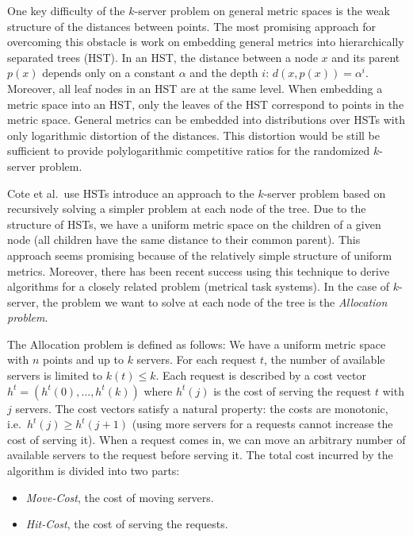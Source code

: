 One key difficulty of the $k$-server problem on general metric spaces is the weak structure of the distances between points.
The most promising approach for overcoming this obstacle is work on embedding general metrics into hierarchically separated trees (HST).
In an HST, the distance between a node $x$ and its parent $p(x)$ depends only on a constant $\alpha$ and the depth $i$: $d(x, p(x)) = \alpha^i$.
Moreover, all leaf nodes in an HST are at the same level.
When embedding a metric space into an HST, only the leaves of the HST correspond to points in the metric space.
General metrics can be embedded into distributions over HSTs with only logarithmic distortion of the distances.
This distortion would be still be sufficient to provide polylogarithmic competitive ratios for the randomized $k$-server problem.

Cote et al.\ use HSTs introduce an approach to the $k$-server problem based on recursively solving a simpler problem at each node of the tree.
Due to the structure of HSTs, we have a uniform metric space on the children of a given node (all children have the same distance to their common parent).
This approach seems promising because of the relatively simple structure of uniform metrics.
Moreover, there has been recent success using this technique to derive algorithms for a closely related problem (metrical task systems).
In the case of $k$-server, the problem we want to solve at each node of the tree is the \emph{Allocation problem}.

The Allocation problem is defined as follows:
We have a uniform metric space with $n$ points and up to $k$ servers.
For each request $t$, the number of available servers is limited to $k(t) \leq k$.
Each request is described by a cost vector $h^t = (h^t(0), \ldots, h^t(k))$ where $h^t(j)$ is the cost of serving the request $t$ with $j$ servers.
The cost vectors satisfy a natural property: the costs are monotonic, i.e.\ $h^t(j) \geq h^t(j + 1)$ (using more servers for a requests cannot increase the cost of serving it).
When a request comes in, we can move an arbitrary number of available servers to the request before serving it.
The total cost incurred by the algorithm is divided into two parts:
\begin{itemize}
\item \emph{Move-Cost}, the cost of moving servers.
\item \emph{Hit-Cost}, the cost of serving the requests.
\end{itemize}

